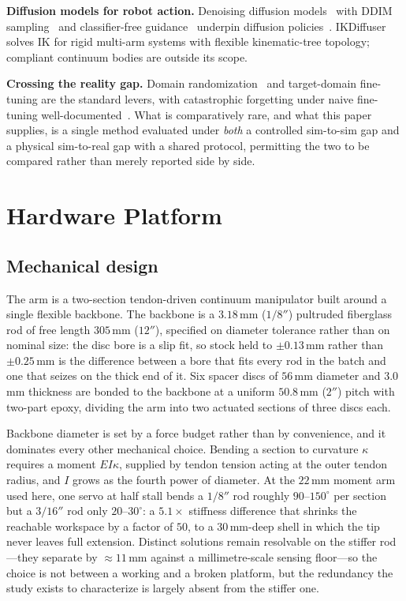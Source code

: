 \documentclass[letterpaper, 10pt, conference]{ieeeconf}
\begin{document}
\textbf{Diffusion models for robot action.} Denoising diffusion
models~\cite{ho2020denoising} with DDIM sampling~\cite{song2021denoising} and
classifier-free guidance~\cite{ho2022classifier} underpin diffusion
policies~\cite{chi2023diffusion}. IKDiffuser~\cite{zhang2025ikdiffuser} solves
IK for rigid multi-arm systems with flexible kinematic-tree topology;
compliant continuum bodies are outside its scope.

\textbf{Crossing the reality gap.} Domain
randomization~\cite{tobin2017domain} and target-domain fine-tuning are the
standard levers, with catastrophic forgetting under naive fine-tuning
well-documented~\cite{kirkpatrick2017overcoming}. What is comparatively rare,
and what this paper supplies, is a single method evaluated under \emph{both}
a controlled sim-to-sim gap and a physical sim-to-real gap with a shared
protocol, permitting the two to be compared rather than merely reported
side by side.

\section{Hardware Platform}
\label{sec:hardware}

\subsection{Mechanical design}

The arm is a two-section tendon-driven continuum manipulator built around a
single flexible backbone. The backbone is a $3.18\,$mm ($1/8''$) pultruded
fiberglass rod of free length $305\,$mm ($12''$), specified on diameter
tolerance rather than on nominal size: the disc bore is a slip fit, so stock
held to $\pm0.13\,$mm rather than $\pm0.25\,$mm is the difference between a
bore that fits every rod in the batch and one that seizes on the thick end of
it. Six spacer discs of
$56\,$mm diameter and $3.0\,$mm thickness are bonded to
the backbone at a uniform $50.8\,$mm ($2''$) pitch with two-part epoxy,
dividing the arm into two actuated sections of three discs each.

Backbone diameter is set by a force budget rather than by convenience, and it
dominates every other mechanical choice. Bending a section to curvature
$\kappa$ requires a moment $EI\kappa$, supplied by tendon tension acting at
the outer tendon radius, and $I$ grows as the fourth power of diameter. At the
$22\,$mm moment arm used here, one servo at half stall bends a $1/8''$ rod
roughly $90$--$150^\circ$ per section but a $3/16''$ rod only $20$--$30^\circ$:
a $5.1\times$ stiffness difference that shrinks the reachable workspace by a
factor of $50$, to a $30\,$mm-deep shell in which the tip never leaves full
extension. Distinct solutions remain resolvable on the stiffer rod---they
separate by $\approx\!11\,$mm against a millimetre-scale sensing floor---so the
choice is not between a working and a broken platform, but the redundancy the
study exists to characterize is largely absent from the stiffer one.
\end{document}
